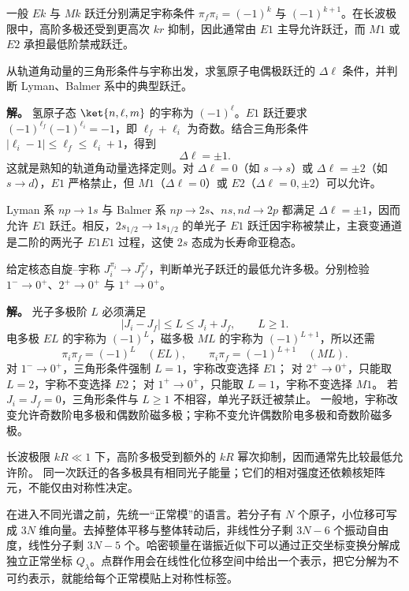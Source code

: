 一般 $Ek$ 与 $Mk$ 跃迁分别满足宇称条件 $\pi_f\pi_i=(-1)^k$ 与 $(-1)^{k+1}$。在长波极限中，高阶多极还受到更高次 $kr$ 抑制，因此通常由 $E1$ 主导允许跃迁，而 $M1$ 或 $E2$ 承担最低阶禁戒跃迁。

\begin{example}
从轨道角动量的三角形条件与宇称出发，求氢原子电偶极跃迁的 $\Delta\ell$ 条件，并判断 Lyman、Balmer 系中的典型跃迁。

\textbf{解。} 氢原子态 $\ket{n,\ell,m}$ 的宇称为 $(-1)^\ell$。$E1$ 跃迁要求 $(-1)^{\ell_f}(-1)^{\ell_i}=-1$，即 $\ell_f+\ell_i$ 为奇数。结合三角形条件 $|\ell_i-1|\le\ell_f\le\ell_i+1$，得到
\[
\Delta\ell=\pm1.
\]
这就是熟知的轨道角动量选择定则。对 $\Delta\ell=0$（如 $s\to s$）或 $\Delta\ell=\pm2$（如 $s\to d$），$E1$ 严格禁止，但 $M1$（$\Delta\ell=0$）或 $E2$（$\Delta\ell=0,\pm2$）可以允许。

Lyman 系 $np\to1s$ 与 Balmer 系 $np\to2s$、$ns,nd\to2p$ 都满足
$\Delta\ell=\pm1$，因而允许 $E1$ 跃迁。相反，$2s_{1/2}\to1s_{1/2}$ 的单光子
$E1$ 跃迁因宇称被禁止，主衰变通道是二阶的两光子 $E1E1$ 过程，这使 $2s$
态成为长寿命亚稳态。
\end{example}

\begin{example}[{核跃迁中的多极展开}]
给定核态自旋--宇称 $J_i^{\pi_i}\to J_f^{\pi_f}$，判断单光子跃迁的最低允许多极。分别检验 $1^-\to0^+$、$2^+\to0^+$ 与 $1^+\to0^+$。

\textbf{解。} 光子多极阶 $L$ 必须满足
\[
 |J_i-J_f|\le L\le J_i+J_f,\qquad L\ge1.
\]
电多极 $EL$ 的宇称为 $(-1)^L$，磁多极 $ML$ 的宇称为 $(-1)^{L+1}$，所以还需
\[
 \pi_i\pi_f=(-1)^L\quad(EL),\qquad
 \pi_i\pi_f=(-1)^{L+1}\quad(ML).
\]
对 $1^-\to0^+$，三角形条件强制 $L=1$，宇称改变选择 $E1$；
对 $2^+\to0^+$，只能取 $L=2$，宇称不变选择 $E2$；
对 $1^+\to0^+$，只能取 $L=1$，宇称不变选择 $M1$。
若 $J_i=J_f=0$，三角形条件与 $L\ge1$ 不相容，单光子跃迁被禁止。
一般地，宇称改变允许奇数阶电多极和偶数阶磁多极；宇称不变允许偶数阶电多极和奇数阶磁多极。

长波极限 $kR\ll1$ 下，高阶多极受到额外的 $kR$ 幂次抑制，因而通常先比较最低允许阶。
同一次跃迁的各多极具有相同光子能量；它们的相对强度还依赖核矩阵元，不能仅由对称性决定。
\end{example}

在进入不同光谱之前，先统一“正常模”的语言。若分子有 $N$ 个原子，小位移可写成 $3N$ 维向量。去掉整体平移与整体转动后，非线性分子剩 $3N-6$ 个振动自由度，线性分子剩 $3N-5$ 个。哈密顿量在谐振近似下可以通过正交坐标变换分解成独立正常坐标 $Q_\lambda$。点群作用会在线性化位移空间中给出一个表示，把它分解为不可约表示，就能给每个正常模贴上对称性标签。

